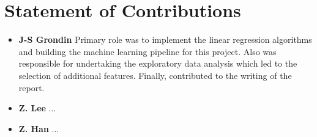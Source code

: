 \documentclass[11pt]{article}
\begin{document}
\section{Statement of Contributions}
\begin{itemize}
    	\item \textbf{J-S Grondin} Primary role was to implement the linear regression algorithms and building the machine learning pipeline for this project. Also was responsible for undertaking the exploratory data analysis which led to the selection of additional features. Finally, contributed to the writing of the report. 
   	\item \textbf{Z. Lee} ...
    	\item \textbf{Z. Han} ...
\end{itemize}
\end{document}
